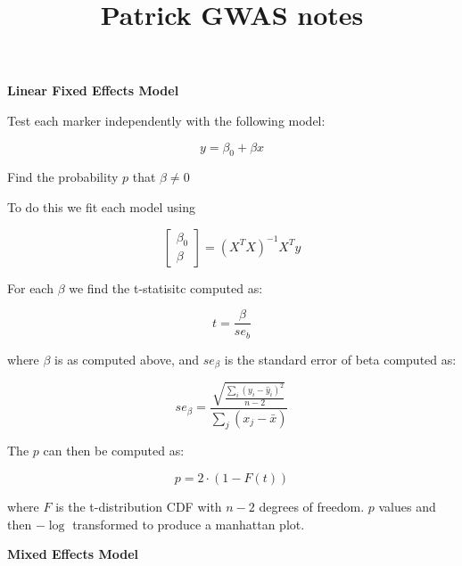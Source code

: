 \documentclass{article}
\begin{document}
\title{Patrick GWAS notes}
\setlength{\droptitle}{-12em}
\date{}
\maketitle
\vspace*{-20mm}
\setlength{\parindent}{0pt}
\noindent\textbf{Linear Fixed Effects Model}
\vspace{2mm}

Test each marker independently with the following model:


\begin{equation*}
y = \beta_0 + \beta x
\end{equation*}

Find the probability $p$ that $\beta \neq 0$ 
\newline

To do this we fit each model using


\[
\begin{bmatrix}
\beta_0\\
\beta\end{bmatrix}
=(X^T X)^{-1} X^T y\]

For each $\beta$ we find the t-statisitc computed as:

\begin{equation*}
t = \frac{\beta}{se_b} 
\end{equation*}

where $\beta$ is as computed above, and $se_\beta$ is the standard error of beta computed as:

\begin{equation*}
se_\beta = \frac{\sqrt{\frac{\sum_i (y_i - \hat{y}_i)^2} {n-2}}}{\sum_j (x_j-\bar{x})}
\end{equation*}

The $p$ can then be computed as:

\begin{equation*}
p=2\cdot(1-F(t))
\end{equation*}

where $F$ is the t-distribution CDF with $n-2$ degrees of freedom. $p$ values and then $-\log$ transformed to produce a manhattan plot.
\newline

\noindent\textbf{Mixed Effects Model}
\end{document}

